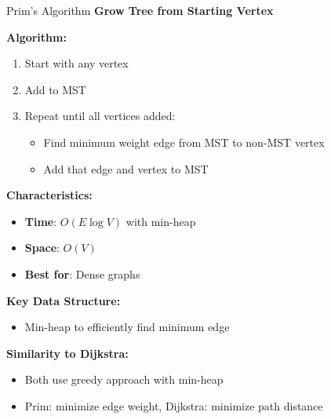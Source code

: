 \documentclass[aspectratio=169]{beamer}
\begin{document}
\begin{frame}{Prim's Algorithm}
  \textbf{Grow Tree from Starting Vertex}

  \vspace{0.3cm}
  \textbf{Algorithm:}
  \begin{enumerate}
    \item Start with any vertex
    \item Add to MST
    \item Repeat until all vertices added:
    \begin{itemize}
      \item Find minimum weight edge from MST to non-MST vertex
      \item Add that edge and vertex to MST
    \end{itemize}
  \end{enumerate}

  \vspace{0.3cm}
  \textbf{Characteristics:}
  \begin{itemize}
    \item \textbf{Time}: $O(E \log V)$ with min-heap
    \item \textbf{Space}: $O(V)$
    \item \textbf{Best for}: Dense graphs
  \end{itemize}

  \vspace{0.3cm}
  \textbf{Key Data Structure:}
  \begin{itemize}
    \item Min-heap to efficiently find minimum edge
  \end{itemize}

  \vspace{0.3cm}
  \textbf{Similarity to Dijkstra:}
  \begin{itemize}
    \item Both use greedy approach with min-heap
    \item Prim: minimize edge weight, Dijkstra: minimize path distance
  \end{itemize}
\end{frame}
\end{document}

